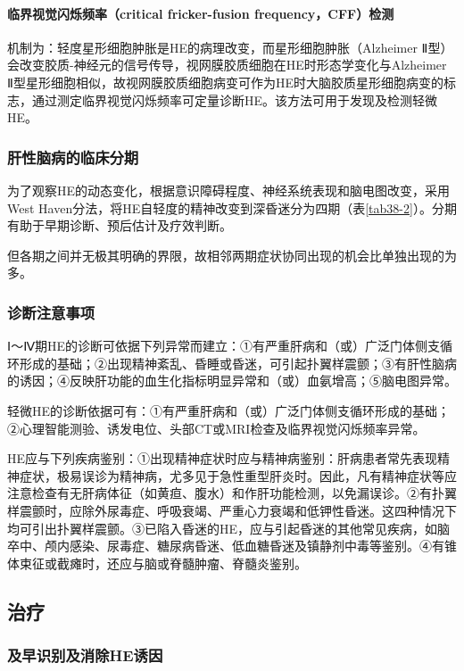 \paragraph{临界视觉闪烁频率（critical fricker-fusion frequency，CFF）检测}

机制为：轻度星形细胞肿胀是HE的病理改变，而星形细胞肿胀（Alzheimer
Ⅱ型）会改变胶质-神经元的信号传导，视网膜胶质细胞在HE时形态学变化与Alzheimer
Ⅱ型星形细胞相似，故视网膜胶质细胞病变可作为HE时大脑胶质星形细胞病变的标志，通过测定临界视觉闪烁频率可定量诊断HE。该方法可用于发现及检测轻微HE。

\subsubsection{肝性脑病的临床分期}

为了观察HE的动态变化，根据意识障碍程度、神经系统表现和脑电图改变，采用West
Haven分法，将HE自轻度的精神改变到深昏迷分为四期（表\ref{tab38-2}）。分期有助于早期诊断、预后估计及疗效判断。

但各期之间并无极其明确的界限，故相邻两期症状协同出现的机会比单独出现的为多。

\subsubsection{诊断注意事项}

Ⅰ～Ⅳ期HE的诊断可依据下列异常而建立：①有严重肝病和（或）广泛门体侧支循环形成的基础；②出现精神紊乱、昏睡或昏迷，可引起扑翼样震颤；③有肝性脑病的诱因；④反映肝功能的血生化指标明显异常和（或）血氨增高；⑤脑电图异常。

轻微HE的诊断依据可有：①有严重肝病和（或）广泛门体侧支循环形成的基础；②心理智能测验、诱发电位、头部CT或MRI检查及临界视觉闪烁频率异常。

HE应与下列疾病鉴别：①出现精神症状时应与精神病鉴别：肝病患者常先表现精神症状，极易误诊为精神病，尤多见于急性重型肝炎时。因此，凡有精神症状等应注意检查有无肝病体征（如黄疸、腹水）和作肝功能检测，以免漏误诊。②有扑翼样震颤时，应除外尿毒症、呼吸衰竭、严重心力衰竭和低钾性昏迷。这四种情况下均可引出扑翼样震颤。③已陷入昏迷的HE，应与引起昏迷的其他常见疾病，如脑卒中、颅内感染、尿毒症、糖尿病昏迷、低血糖昏迷及镇静剂中毒等鉴别。④有锥体束征或截瘫时，还应与脑或脊髓肿瘤、脊髓炎鉴别。

\subsection{治疗}

\subsubsection{及早识别及消除HE诱因}

